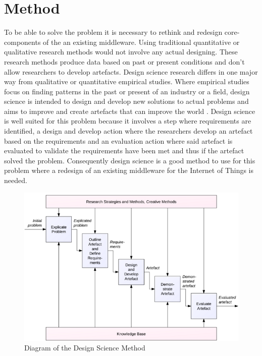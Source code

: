 \chapter{Method}
To be able to solve the problem it is necessary to rethink and redesign core-components of the an existing middleware. Using traditional quantitative or qualitative research methods would not involve any actual designing. These research methods produce data based on past or present conditions and don't allow researchers to develop artefacts.
Design science research differs in one major way from qualitative or quantitative empirical studies. Where empirical studies focus on finding patterns in the past or present of an industry or a field, design science is intended to design and develop new solutions to actual problems \cite{bider2012design} and aims to improve and create artefacts that can improve the world \cite{johannesson2012design}. 
Design science is well suited for this problem because it involves a step where requirements are identified, a design and develop action where the researchers develop an artefact based on the requirements and an evaluation action where said artefact is evaluated to validate the requirements have been met and thus if the artefact solved the problem. Consequently design science is a good method to use for this problem where a redesign of an existing middleware for the Internet of Things is needed.

\begin{figure}[h!]
	\centering
    	\includegraphics[scale=0.50]{part_3/design_science.png}
		\caption{Diagram of the Design Science Method \cite{johannesson2012design}} 
		\label{ds}
\end{figure}

